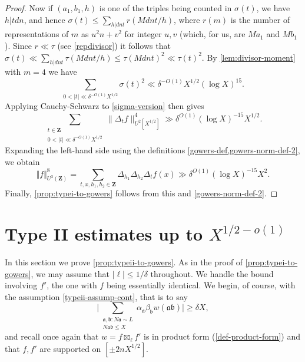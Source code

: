 \documentclass[11pt,reqno]{amsart}
\numberwithin{equation}{section}
\theoremstyle{definition}
\theoremstyle{remark}
\newcommand{\snorm}[1]{\lVert#1\rVert}
\newcommand{\mf}{\mathfrak}
\renewcommand{\le}{\leqslant}
\renewcommand{\ge}{\geqslant}
\newcommand\Z{\mathbf{Z}}
\begin{document}
\begin{proof}
Now if $(a_1,b_1,h)$ is one of the triples being counted in $\sigma(t)$, we have $h | tdn$, and hence $\sigma(t) \le \sum_{h | dnt} r(Mdnt/h)$, where $r(m)$ is the number of representations of $m$ as $u^2n + v^2$ for integer $u,v$ (which, for us, are $Ma_1$ and $Mb_1$). Since $r \ll \tau$ (see \cref{repdivisor}) it follows that $\sigma(t) \ll \sum_{h | dnt} \tau (Mdnt/h) \le \tau(Mdnt)^2 \ll \tau(t)^2$. By \cref{lem:divisor-moment} with $m = 4$ we have \[ \sum_{0 < |t| \ll \delta^{-O(1)} X^{1/2}} \sigma(t)^2 \ll \delta^{-O(1)} X^{1/2} (\log X)^{15}.\] Applying Cauchy-Schwarz to \cref{sigma-version} then gives 
\[ \sum_{\substack{t \in \Z \\ 0 < |t| \ll \delta^{-O(1)} X^{1/2}}}  \snorm{\Delta_{t}f}_{U^2[X^{1/2}]}^{4} \gg \delta^{O(1)} (\log X)^{-15}X^{1/2}.\]
Expanding the left-hand side using the definitions \cref{gowers-def,gowers-norm-def-2}, we obtain
\[ \Vert f \Vert_{U^3(\Z)}^8 = \sum_{t, x, h_1, h_2 \in \Z} \Delta_{h_1} \Delta_{h_2} \Delta_t f(x) \gg \delta^{O(1)} (\log X)^{-15} X^2.\]
Finally, \cref{prop:typei-to-gowers} follows from this and \cref{gowers-norm-def-2}. 
\end{proof}


\section{Type II estimates up to \texorpdfstring{$X^{1/2-o(1)}$}{}}\label{section7}

In this section we prove \cref{prop:typeii-to-gowers}. As in the proof of \cref{prop:typei-to-gowers}, we may assume that $|\ell| \le 1/\delta$ throughout. We handle the bound involving $f'$, the one with $f$ being essentially identical. We begin, of course, with the assumption \cref{typeii-assump-cont}, that is to say
\[\Big| \sum_{\substack{ \mf{a}, \mf{b}: N\mf{a} \sim  L \\ N\mf{a}\mf{b} \le X}} \alpha_{\mf{a}} \beta_{\mf{b}} w(\mf{a} \mf{b}) \Big| \ge \delta X,\] and recall once again that $w = f \boxtimes_{\ell} f'$ is in product form (\cref{def-product-form}) and that $f,f'$ are supported on $[\pm 2nX^{1/2}]$.
\end{document}
